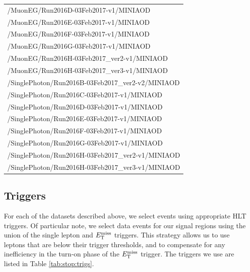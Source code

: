 \begin{table}[htbp]
\begin{tabular}{l}
  /MuonEG/Run2016D-03Feb2017-v1/MINIAOD \\
  /MuonEG/Run2016E-03Feb2017-v1/MINIAOD \\
  /MuonEG/Run2016F-03Feb2017-v1/MINIAOD \\
  /MuonEG/Run2016G-03Feb2017-v1/MINIAOD \\
  /MuonEG/Run2016H-03Feb2017\_ver2-v1/MINIAOD \\
  /MuonEG/Run2016H-03Feb2017\_ver3-v1/MINIAOD \\
\hline
  /SinglePhoton/Run2016B-03Feb2017\_ver2-v2/MINIAOD \\
  /SinglePhoton/Run2016C-03Feb2017-v1/MINIAOD \\
  /SinglePhoton/Run2016D-03Feb2017-v1/MINIAOD \\
  /SinglePhoton/Run2016E-03Feb2017-v1/MINIAOD \\
  /SinglePhoton/Run2016F-03Feb2017-v1/MINIAOD \\
  /SinglePhoton/Run2016G-03Feb2017-v1/MINIAOD \\
  /SinglePhoton/Run2016H-03Feb2017\_ver2-v1/MINIAOD \\
  /SinglePhoton/Run2016H-03Feb2017\_ver3-v1/MINIAOD \\
\hline
\end{tabular}
\end{table}

\subsection{Triggers}
\label{ssec:stop:triggers}

For each of the datasets described above, we select events using
appropriate HLT triggers. Of particular note, we select data events
for our signal regions using the union of the single lepton and $E_\text{T}^\text{miss}$
triggers. This strategy allows us to use leptons that are below their
trigger thresholds, and to compensate for any inefficiency in the
turn-on phase of the $E_\text{T}^\text{miss}$ trigger. The triggers we use are
listed in Table \ref{tab:stop:trigs}.

